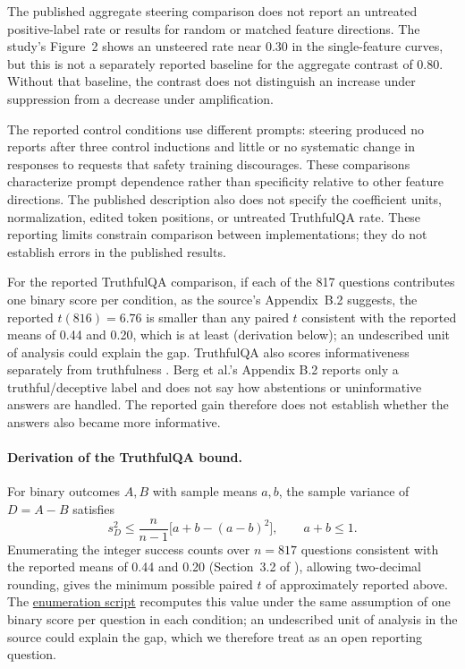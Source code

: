 \documentclass[11pt]{article}
\newcommand{\closeoutartifact}[2]{\href{https://github.com/tdj28/llm_selfref_pre/blob/294da265ee3a08b9ef42343f9461b8d4718b7bc7/#1}{#2}}
\begin{document}
The published aggregate steering comparison does not report an untreated
positive-label rate or results for random or matched feature directions.
The study's Figure~2 shows an unsteered rate near 0.30 in the single-feature curves,
but this is not a separately reported baseline for the aggregate contrast
of 0.80. Without that baseline, the contrast does not distinguish an
increase under suppression from a decrease under amplification.

The reported control conditions use different prompts: steering produced
no reports after three control inductions and little or no systematic
change in responses to requests that safety training discourages. These
comparisons characterize prompt dependence rather than specificity
relative to other feature directions. The published description also
does not specify the coefficient units, normalization, edited token
positions, or untreated TruthfulQA rate. These reporting limits constrain
comparison between implementations; they do not establish errors in the
published results.

For the reported TruthfulQA comparison, if each of the 817 questions
contributes one binary score per condition, as the source's Appendix~B.2
suggests, the reported $t(816)=6.76$ is smaller than any paired $t$
consistent with the reported means of 0.44 and 0.20, which is at least
\TruthfulQAMinPairedT{} (derivation below); an undescribed unit of analysis
could explain the gap. TruthfulQA also scores informativeness separately
from truthfulness \citep{lin2022truthfulqa}. Berg et al.'s Appendix B.2
reports only a truthful/deceptive label and does not say how abstentions
or uninformative answers are handled. The reported gain therefore does
not establish whether the answers also became more informative.

\paragraph{Derivation of the TruthfulQA bound.}
For binary outcomes $A,B$ with sample means $a,b$, the sample variance of
$D=A-B$ satisfies
\[
 s_D^2 \leq \frac{n}{n-1}\bigl[a+b-(a-b)^2\bigr],
 \qquad a+b\leq 1.
\]
Enumerating the integer success counts over $n=817$ questions consistent
with the reported means of 0.44 and 0.20 (Section~3.2 of
\citealp{berg2025largelanguagemodelsreport}), allowing two-decimal rounding,
gives the minimum possible paired $t$ of approximately \TruthfulQAMinPairedT{}
reported above. The
\closeoutartifact{scripts/verify_reporting_bound.py}{enumeration script}
recomputes this value under the same assumption of one binary score per
question in each condition; an undescribed unit of analysis in the source
could explain the gap, which we therefore treat as an open reporting question.
\end{document}

